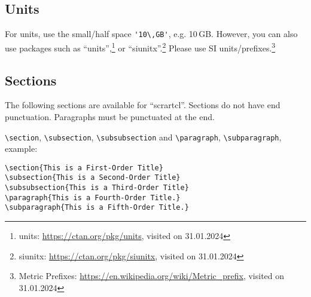 \documentclass[
  paper       = a4,
  headheight  = 16pt,
  footheight  = 16pt,
  fontsize    = 10pt,
  twoside     = true,
  titlepage   = true,
]{scrartcl}
\begin{document}
\subsection{Units}

For units, use the small/half space \lstinline|'10\,GB'|, e.g. 10\,GB.
However, you can also use packages such as \enquote{units},\footnote{units: \url{https://ctan.org/pkg/units}, visited on 31.01.2024}
or \enquote{siunitx}.\footnote{siunitx: \url{https://ctan.org/pkg/siunitx}, visited on 31.01.2024}
Please use SI units/prefixes.\footnote{Metric Prefixes: \url{https://en.wikipedia.org/wiki/Metric_prefix}, visited on 31.01.2024}


\subsection{Sections}

The following sections are available for \enquote{scrartcl}.
Sections do not have end punctuation.
Paragraphs must be punctuated at the end.

\verb|\section|, \verb|\subsection|, \verb|\subsubsection| and \verb|\paragraph|, \verb|\subparagraph|, example:
\begin{verbatim}
\section{This is a First-Order Title}
\subsection{This is a Second-Order Title}
\subsubsection{This is a Third-Order Title}
\paragraph{This is a Fourth-Order Title.}
\subparagraph{This is a Fifth-Order Title.}
\end{verbatim}
\end{document}
